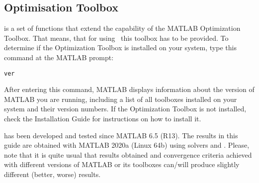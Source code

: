 \subsection{Optimisation Toolbox}
 is a set of functions that extend the capability of the
MATLAB Optimization Toolbox. That means, that for using~
this toolbox has to be provided. To determine if the Optimization
Toolbox is installed on your system, type this command at the MATLAB
prompt:
\begin{verbatim}
ver
\end{verbatim}
After entering this command, MATLAB displays information about the
version of MATLAB you are running, including a list of all toolboxes
installed on your system and their version numbers.  If the
Optimization Toolbox is not installed, check the Installation Guide
for instructions on how to install it.

 has been developed and tested since MATLAB 6.5 (R13). The
results in this guide are obtained with MATLAB 2020a (Linux 64b) using
solvers  and . Please, note that it is quite
usual that results obtained and convergence criteria achieved with
different versions of MATLAB or its toolboxes can/will produce
slightly different (better, worse) results.


